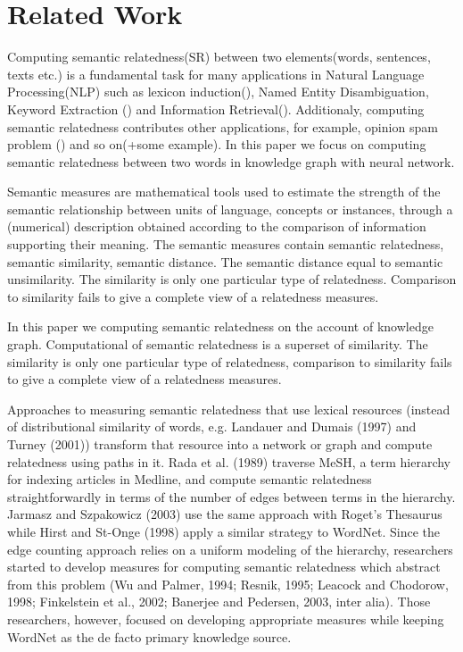 \section{Related Work}
Computing semantic relatedness(SR) between two elements(words, sentences,
texts etc.) is a fundamental task for many applications in Natural Language
Processing(NLP) such as lexicon induction(\cite{aaai/QadirMGL15}), Named 
Entity Disambiguation{\cite{acl/HanZ10}}, Keyword Extraction
(\cite{ijcai/ZhangFW13}) and Information Retrieval(\cite{acl/GurevychMZ07}). 
Additionaly, computing semantic relatedness contributes other applications, 
for example, opinion spam problem (\cite{www/SandulescuE15}) and so on(+some example). 
In this paper we focus on computing semantic relatedness between two 
words in knowledge graph with neural network.


Semantic measures are mathematical tools used to estimate the strength of the 
semantic relationship between units of language, concepts or instances, through 
a (numerical) description obtained according to the comparison of information 
supporting their meaning. The semantic measures contain semantic relatedness,
semantic similarity, semantic distance. The semantic distance equal to semantic 
unsimilarity. The similarity is only one particular type of relatedness.
Comparison to similarity fails to give a complete view of a relatedness measures.


In this paper we computing semantic relatedness on the account of knowledge
graph. Computational of semantic relatedness is a superset of similarity.
The similarity is only one particular type of relatedness, comparison to
similarity fails to give a complete view of a relatedness measures.

Approaches to measuring semantic relatedness that use lexical
resources (instead of distributional similarity of words, 
e.g. Landauer and Dumais (1997) and Turney (2001)) transform
that resource into a network or graph and compute
relatedness using paths in it. Rada et al. (1989) traverse
MeSH, a term hierarchy for indexing articles in Medline,
and compute semantic relatedness straightforwardly in
terms of the number of edges between terms in the hierarchy.
Jarmasz and Szpakowicz (2003) use the same approach
with Roget’s Thesaurus while Hirst and St-Onge (1998) apply
a similar strategy to WordNet. Since the edge counting
approach relies on a uniform modeling of the hierarchy,
researchers started to develop measures for computing semantic
relatedness which abstract from this problem (Wu and
Palmer, 1994; Resnik, 1995; Leacock and Chodorow, 1998;
Finkelstein et al., 2002; Banerjee and Pedersen, 2003, inter
alia). Those researchers, however, focused on developing
appropriate measures while keeping WordNet as the de facto
primary knowledge source.

